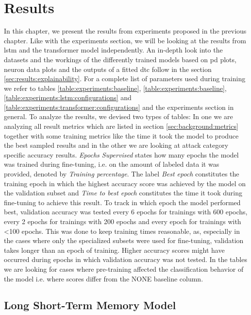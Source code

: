 \chapter{Results} \label{sec:results}

In this chapter, we present the results from experiments proposed in the previous chapter. Like with the experiments section, we will be looking at the results from \gls{lstm} and the transformer model independently. An in-depth look into the datasets and the workings of the differently trained models based on \gls{pd} plots, neuron data plots and the outputs of a fitted \gls{dtc} follow in the section \ref{sec:results:explainability}. For a complete list of parameters used during training we refer to tables \ref{table:experiments:baseline}, \ref{table:experiments:baseline}, \ref{table:experiments:lstm:configurations} and \ref{table:experiments:transformer:configurations} and the experiments section in general. To analyze the results, we devised two types of tables: In one we are analyzing all result metrics which are listed in section \ref{sec:background:metrics} together with some training metrics like the time it took the model to produce the best sampled results and in the other we are looking at attack category specific accuracy results. \textit{Epochs Supervised} states how many epochs the model was trained during fine-tuning, i.e. on the amount of labeled data it was provided, denoted by \textit{Training percentage}. The label \textit{Best epoch} constitutes the training epoch in which the highest accuracy score was achieved by the model on the validation subset and \textit{Time to best epoch} constitutes the time it took during fine-tuning to achieve this result. To track in which epoch the model performed best, validation accuracy was tested every 6 epochs for trainings with 600 epochs, every 2 epochs for trainings with 200 epochs and every epoch for trainings with <100 epochs. This was done to keep training times reasonable, as, especially in the cases where only the specialized subsets were used for fine-tuning, validation takes longer than an epoch of training. Higher accuracy scores might have occurred during epochs in which validation accuracy was not tested. In the tables we are looking for cases where pre-training affected the classification behavior of the model i.e. where scores differ from the NONE baseline column. 

\FloatBarrier

\clearpage

\section{Long Short-Term Memory Model} \label{sec:results:lstm}

